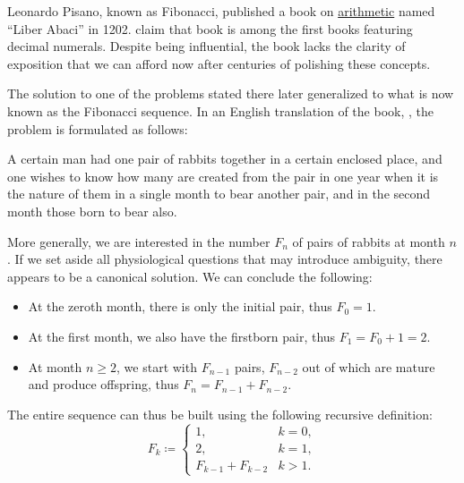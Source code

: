 \begin{example}\label{ex:fibonacci_rabbits}
  Leonardo Pisano, known as Fibonacci, published a book on \hyperref[con:arithmetic]{arithmetic} named \enquote{Liber Abaci} in 1202. \Textcite[54]{БашмаковаЮшкевич1951ПроисхождениеСистемСчисления} claim that book is among the first books featuring decimal numerals. Despite being influential, the book lacks the clarity of exposition that we can afford now after centuries of polishing these concepts.

  The solution to one of the problems stated there later generalized to what is now known as the Fibonacci sequence. In an English translation of the book, \cite{Fibonacci2002LiberAbaci}, the problem is formulated as follows:
  \begin{displayquote}
    A certain man had one pair of rabbits together in a certain enclosed place, and one wishes to know how many are created from the pair in one year when it is the nature of them in a single month to bear another pair, and in the second month those born to bear also.
  \end{displayquote}

  More generally, we are interested in the number \( F_n \) of pairs of rabbits at month \( n \). If we set aside all physiological questions that may introduce ambiguity, there appears to be a canonical solution. We can conclude the following:
  \begin{itemize}
    \item At the zeroth month, there is only the initial pair, thus \( F_0 = 1 \).

    \item At the first month, we also have the firstborn pair, thus \( F_1 = F_0 + 1 = 2 \).

    \item At month \( n \geq 2 \), we start with \( F_{n-1} \) pairs, \( F_{n-2} \) out of which are mature and produce offspring, thus \( F_n = F_{n-1} + F_{n-2} \).
  \end{itemize}

  The entire sequence can thus be built using the following recursive definition:
  \begin{equation*}
    F_k \coloneqq \begin{cases}
      1,                &k = 0, \\
      2,                &k = 1, \\
      F_{k-1} + F_{k-2} &k > 1.
    \end{cases}
  \end{equation*}


\end{example}
